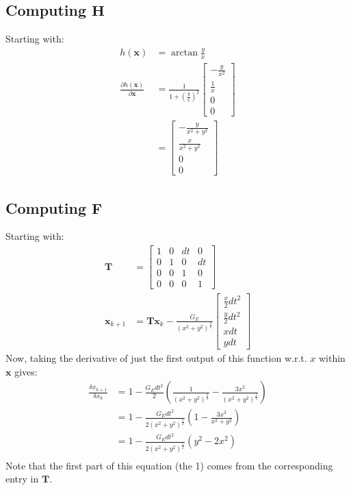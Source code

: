 \documentclass{article}
\newcommand{\mb}[1]{\mathbf{#1}}
\begin{document}
\subsection{Computing $\mb{H}$}
Starting with:
\begin{equation}
    \begin{split}
        h(\mb{x}) &= \arctan\frac{y}{x}\\
        \frac{\partial h(\mb{x})}{\partial \mb{x}} &= 
        \frac{1}{1+\left(\frac{y}{x}\right)^2}
        \begin{bmatrix}
            -\frac{y}{x^2}\\\frac{1}{x}\\0\\0
        \end{bmatrix}\\
        &= \begin{bmatrix}
            -\frac{y}{x^2+y^2}\\\frac{x}{x^2+y^2}\\0\\0
        \end{bmatrix}
    \end{split}
\end{equation}

\subsection{Computing $\mb{F}$}
Starting with:
\begin{equation}
    \begin{split}
        \mb{T} &= \begin{bmatrix}
            1&0&dt&0\\
            0&1&0&dt\\
            0&0&1&0\\
            0&0&0&1
        \end{bmatrix}\\
        \mb{x}_{k+1} &= \mb{T}\mb{x}_k -
        \frac{G_E}{(x^2+y^2)^\frac{3}{2}}\begin{bmatrix}\frac{x}{2} dt^2\\\frac{y}{2}dt^2\\x dt\\y dt\end{bmatrix}
    \end{split}
\end{equation}
Now, taking the derivative of just the first output of this function w.r.t. $x$ within $\mb{x}$ gives:
\begin{equation}
    \begin{split}
    \frac{\delta x_{k+1}}{\delta x_k} &= 1 -         \frac{G_E dt^2}{2}\left(\frac{1}{(x^2+y^2)^\frac{3}{2}}-\frac{3x^2}{(x^2+y^2)^{\frac{5}{2}}}\right)\\
    &= 1- \frac{G_E dt^2}{2(x^2+y^2)^\frac{3}{2}}\left(1-\frac{3x^2}{x^2+y^2}\right)\\
    &= 1- \frac{G_E dt^2}{2(x^2+y^2)^\frac{5}{2}}\left(y^2-2x^2\right)\\
    \end{split}
\end{equation}
Note that the first part of this equation (the 1) comes from the corresponding entry in $\mb{T}$.
\end{document}
